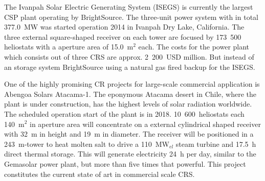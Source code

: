 The Ivanpah Solar Electric Generating System (ISEGS) is currently the largest CSP plant operating by BrightSource. The three-unit power system with in total 377.0~MW was started operation 2014 in Ivanpah Dry Lake, California. The three external square-shaped receiver on each tower are focused by 173~500 heliostats with a aperture area of 15.0~m$^2$ each. The costs for the power plant which consists out of three CRS are approx. 2~200~USD million. But instead of an storage system BrightSource using a natural gas fired backup for the ISEGS. \cite{BrightSourceEnergy2014,NREL2014a}



One of the highly promising CR projects for large-scale commercial application is Abengoa Solars Atacama-1. The eponymous Atacama desert in Chile, where the plant is under construction, has the highest levels of solar radiation worldwide. The scheduled operation start of the plant is in 2018. 10~600~heliostats each 140~m$^2$ in aperture area will concentrate on a external cylindrical shaped receiver with 32~m in height and 19~m in diameter. The receiver will be positioned in a 243~m-tower to heat molten salt to drive a 110~MW$_{el}$ steam turbine and 17.5~h direct thermal storage. This will generate electricity 24~h per day, similar to the Gemasolar power plant, but more than five times that powerful. This project constitutes the current state of art in commercial scale CRS. \cite{NREL2015b,AbengoaSolar2015a,AbengoaSolar2015}
\pagebreak
